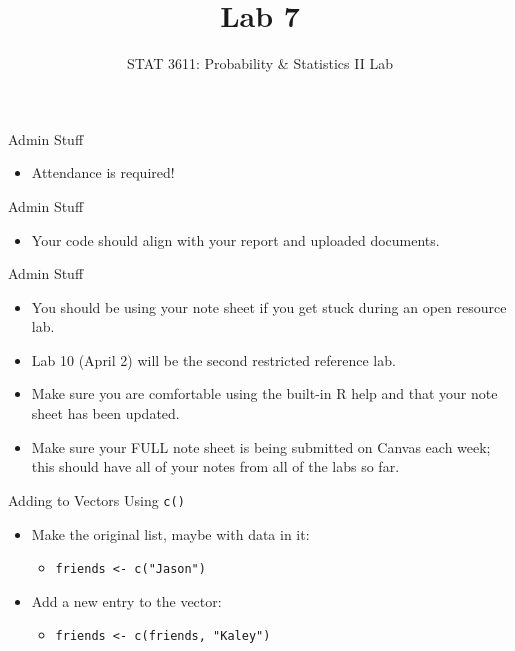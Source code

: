 \documentclass{beamer}
\title{Lab 7}
\author{STAT 3611: Probability \& Statistics II Lab}
\date{}
\begin{document}
\begin{frame}
    \titlepage
\end{frame}

\begin{frame}{Admin Stuff}
    \begin{itemize}
        \item Attendance is required!
    \end{itemize}
\end{frame}

\begin{frame}{Admin Stuff}
    \begin{itemize}
        \item Your code should align with your report and uploaded documents.
    \end{itemize}
\end{frame}

\begin{frame}{Admin Stuff}
    \begin{itemize}
        \item You should be using your note sheet if you get stuck during an open resource lab.
        \item Lab 10 (April 2) will be the second restricted reference lab.
        \item Make sure you are comfortable using the built-in R help and that your note sheet has been updated.
        \item Make sure your FULL note sheet is being submitted on Canvas each week; this should have all of your notes from all of the labs so far.
    \end{itemize}
\end{frame}

\begin{frame}{Adding to Vectors Using \texttt{c()}}
    \begin{itemize}
        \item Make the original list, maybe with data in it:
        \begin{itemize}
            \item \texttt{friends <- c("Jason")}
        \end{itemize}
        \item Add a new entry to the vector:
        \begin{itemize}
            \item \texttt{friends <- c(friends, "Kaley")}
        \end{itemize}
    \end{itemize}
\end{frame}
\end{document}
